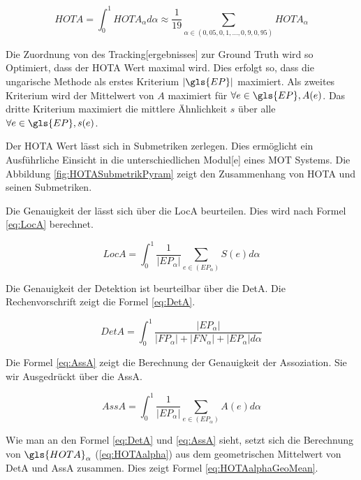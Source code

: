 \begin{equation}
    \label{eq:HOTA}
    HOTA = \int_{0}^{1} HOTA_{\alpha} d\alpha \approx \frac{1}{19} \sum_{\alpha \in (0,05, 0,1, \dots, 0,9, 0,95)} HOTA_{\alpha}
\end{equation}

Die Zuordnung von des \gls{Tracking}[ergebnisses] zur \gls{Ground Truth} wird so Optimiert, dass der \gls{HOTA} Wert maximal wird. Dies erfolgt so, dass die ungarische Methode als erstes Kriterium  \(|\gls{EP}|\) maximiert. Als zweites Kriterium wird der Mittelwert von \(A\) maximiert für \(\forall e \in \gls{EP}, A(e)\). Das dritte Kriterium maximiert die mittlere Ähnlichkeit \(s\) über alle \(\forall e \in \gls{EP}, s(e)\).\par

Der \gls{HOTA} Wert lässt sich in Submetriken zerlegen. Dies ermöglicht ein Ausführliche Einsicht in die unterschiedlichen \gls{Modul}[e] eines \gls{MOT} Systems. Die Abbildung \ref{fig:HOTASubmetrikPyram} zeigt den Zusammenhang von \gls{HOTA} und seinen Submetriken. 


Die Genauigkeit der  lässt sich über die \gls{LocA} beurteilen. Dies wird nach Formel \ref{eq:LocA} berechnet.

\begin{equation}
    \label{eq:LocA}
    LocA = \int_{0}^{1} \frac{1}{|EP_{\alpha}|} \sum_{e \in (EP_{\alpha})} S(e) d\alpha
\end{equation}

Die Genauigkeit der \gls{Detektion} ist beurteilbar über die \gls{DetA}. Die Rechenvorschrift zeigt die Formel \ref{eq:DetA}.

\begin{equation}
    \label{eq:DetA}
    DetA = \int_{0}^{1} \frac{|EP_{\alpha}|}{|FP_{\alpha}| + |FN_{\alpha}| + |EP_{\alpha}| d\alpha}
\end{equation}

Die Formel \ref{eq:AssA} zeigt die Berechnung der Genauigkeit der \gls{Assoziation}. Sie wir Ausgedrückt über die \gls{AssA}. 

\begin{equation}
    \label{eq:AssA}
    AssA = \int_{0}^{1} \frac{1}{|EP_{\alpha}|} \sum_{e \in (EP_{\alpha})} A(e) d\alpha
\end{equation}

Wie man an den Formel \ref{eq:DetA} und \ref{eq:AssA} sieht, setzt sich die Berechnung von \(\gls{HOTA}_{\alpha}\) (\ref{eq:HOTAalpha}) aus dem geometrischen Mittelwert von \gls{DetA} und \gls{AssA} zusammen. Dies zeigt Formel \ref{eq:HOTAalphaGeoMean}.


